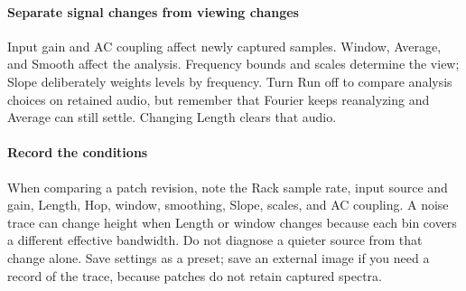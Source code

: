 \paragraph{Separate signal changes from viewing changes}
Input gain and AC coupling affect newly captured samples. Window, Average,
and Smooth affect the analysis. Frequency bounds and scales determine the
view; Slope deliberately weights levels by frequency. Turn Run off to compare
analysis choices on retained audio, but remember that Fourier keeps
reanalyzing and Average can still settle. Changing Length clears that audio.

\paragraph{Record the conditions}
When comparing a patch revision, note the Rack sample rate, input source and
gain, Length, Hop, window, smoothing, Slope, scales, and AC coupling. A noise
trace can change height when Length or window changes because each bin covers
a different effective bandwidth. Do not diagnose a quieter source from that
change alone. Save settings as a preset; save an external image if you need a
record of the trace, because patches do not retain captured spectra.
